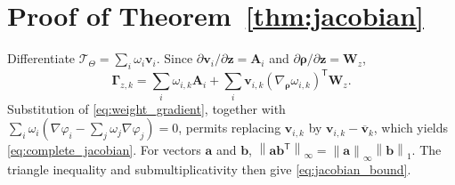 \documentclass[journal]{IEEEtran}
\newcommand{\norm}[1]{\left\lVert #1\right\rVert}
\newcommand{\T}{\mathsf T}
\newcommand{\1}{\bm 1}
\begin{document}
\section{Proof of Theorem~\ref{thm:jacobian}}
Differentiate
$\mathcal T_\Theta=\sum_i\omega_i\bm v_i$. Since
$\partial\bm v_i/\partial\bm z=\bm A_i$ and
$\partial\bm\rho/\partial\bm z=\bm W_z$,
\begin{equation}
\bm\Gamma_{z,k}=\sum_i\omega_{i,k}\bm A_i+
\sum_i\bm v_{i,k}
(\nabla_{\bm\rho}\omega_{i,k})^\T\bm W_z.
\end{equation}
Substitution of \eqref{eq:weight_gradient}, together with
$\sum_i\omega_i(\nabla\varphi_i-\sum_j\omega_j\nabla\varphi_j)=0$,
permits replacing $\bm v_{i,k}$ by
$\bm v_{i,k}-\overline{\bm v}_k$, which yields
\eqref{eq:complete_jacobian}. For vectors $\bm a$ and $\bm b$,
$\norm{\bm a\bm b^\T}_\infty=\norm{\bm a}_\infty\norm{\bm b}_1$.
The triangle inequality and submultiplicativity then give
\eqref{eq:jacobian_bound}.
\end{document}

